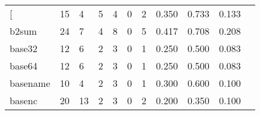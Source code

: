 \begin{longtable}{lp{1.2cm}p{1.2cm}p{1.2cm}p{1.2cm}p{1.2cm}p{1.2cm}p{1.2cm}p{1.2cm}p{1.2cm}p{1.2cm}}
\bottomrule
\endlastfoot
{[}         &                                    15 &                                                  4 &                                                  5 &                                                  4 &                                                  0 &                                                  2 &                                         0.350 &                                              0.733 &                                              0.133 \\
b2sum     &                                    24 &                                                  7 &                                                  4 &                                                  8 &                                                  0 &                                                  5 &                                         0.417 &                                              0.708 &                                              0.208 \\
base32    &                                    12 &                                                  6 &                                                  2 &                                                  3 &                                                  0 &                                                  1 &                                         0.250 &                                              0.500 &                                              0.083 \\
base64    &                                    12 &                                                  6 &                                                  2 &                                                  3 &                                                  0 &                                                  1 &                                         0.250 &                                              0.500 &                                              0.083 \\
basename  &                                    10 &                                                  4 &                                                  2 &                                                  3 &                                                  0 &                                                  1 &                                         0.300 &                                              0.600 &                                              0.100 \\
basenc    &                                    20 &                                                 13 &                                                  2 &                                                  3 &                                                  0 &                                                  2 &                                         0.200 &                                              0.350 &                                              0.100 \\

\end{longtable}

